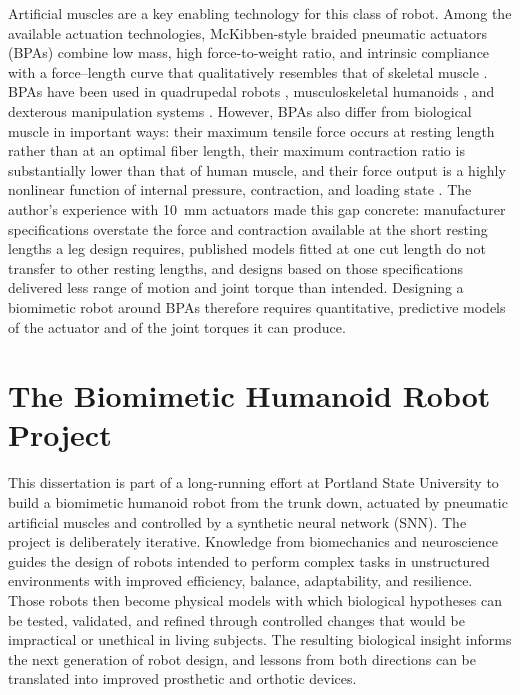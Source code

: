 Artificial muscles are a key enabling technology for this class of robot. Among the available actuation technologies, McKibben-style braided pneumatic actuators (BPAs) combine low mass, high force-to-weight ratio, and intrinsic compliance with a force--length curve that qualitatively resembles that of skeletal muscle \citep{liang_comparative_2020, hunt_modeling_2017}. BPAs have been used in quadrupedal robots \citep{aschenbeck_design_2006, hunt_modeling_2017, scharzenberger_design_2019}, musculoskeletal humanoids \citep{asano_design_2017, hitzmann_anthropomorphic_2018}, and dexterous manipulation systems \citep{chen_realizing_2019}. However, BPAs also differ from biological muscle in important ways: their maximum tensile force occurs at resting length rather than at an optimal fiber length, their maximum contraction ratio is substantially lower than that of human muscle, and their force output is a highly nonlinear function of internal pressure, contraction, and loading state \citep{hunt_modeling_2017, sarosi_comparative_2017, liang_comparative_2020}. The author's experience with \qty{10}{\mm} actuators made this gap concrete: manufacturer specifications overstate the force and contraction available at the short resting lengths a leg design requires, published models fitted at one cut length do not transfer to other resting lengths, and designs based on those specifications delivered less range of motion and joint torque than intended. Designing a biomimetic robot around BPAs therefore requires quantitative, predictive models of the actuator and of the joint torques it can produce.

\section{The Biomimetic Humanoid Robot Project}\label{sec:project}

This dissertation is part of a long-running effort at Portland State University to build a biomimetic humanoid robot from the trunk down, actuated by pneumatic artificial muscles and controlled by a synthetic neural network (SNN). The project is deliberately iterative. Knowledge from biomechanics and neuroscience guides the design of robots intended to perform complex tasks in unstructured environments with improved efficiency, balance, adaptability, and resilience. Those robots then become physical models with which biological hypotheses can be tested, validated, and refined through controlled changes that would be impractical or unethical in living subjects. The resulting biological insight informs the next generation of robot design, and lessons from both directions can be translated into improved prosthetic and orthotic devices.

